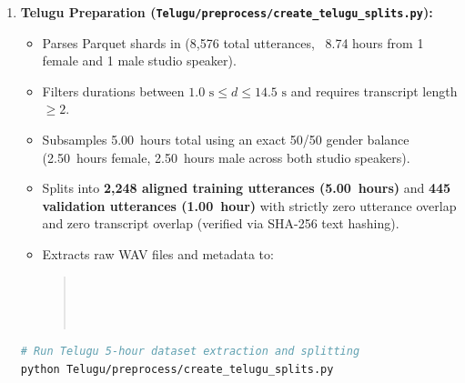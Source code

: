 \documentclass[11pt,a4paper]{report}
\begin{document}
\begin{enumerate}
    \item \textbf{Telugu Preparation (\texttt{Telugu/preprocess/create\_telugu\_splits.py}):}
    \begin{itemize}
        \item Parses Parquet shards in  (8{,}576 total utterances, ~8.74 hours from 1 female and 1 male studio speaker).
        \item Filters durations between $1.0\text{ s} \le d \le 14.5\text{ s}$ and requires transcript length $\ge 2$.
        \item Subsamples 5.00~hours total using an exact 50/50 gender balance (2.50~hours female, 2.50~hours male across both studio speakers).
        \item Splits into \textbf{2{,}248 aligned training utterances (5.00~hours)} and \textbf{445 validation utterances (1.00~hour)} with strictly zero utterance overlap and zero transcript overlap (verified via SHA-256 text hashing).
        \item Extracts raw WAV files and metadata to:
        \begin{quote}
        \\
        \\
        \\
        \end{quote}
    \end{itemize}
\begin{lstlisting}[language=bash]
# Run Telugu 5-hour dataset extraction and splitting
python Telugu/preprocess/create_telugu_splits.py
\end{lstlisting}
\end{enumerate}
\end{document}
